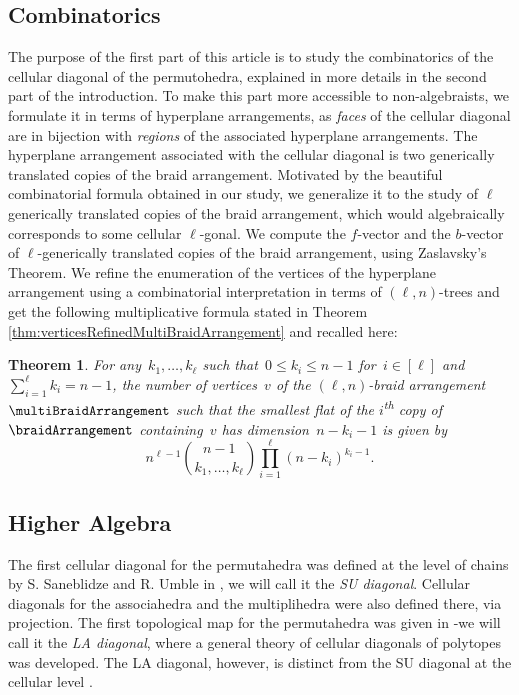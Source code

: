 \documentclass{amsart}
\newtheorem*{theorem*}{Theorem}
\theoremstyle{definition}
\newcommand{\ordinal}{\textsuperscript{th}} %
\begin{document}
\subsection*{Combinatorics}

The purpose of the first part of this article is to study the combinatorics of the cellular diagonal of the permutohedra, explained in more details in the second part of the introduction.
 To make this part more accessible to non-algebraists, we formulate it in terms of hyperplane arrangements, as \emph{faces} of the cellular diagonal are in bijection with \emph{regions} of the associated hyperplane arrangements. 
 The hyperplane arrangement associated with  the cellular diagonal is two generically translated copies of the braid arrangement. 
 Motivated by the beautiful combinatorial formula obtained in our study, we generalize it to the study of $\ell$ generically translated copies of the braid arrangement, which would algebraically corresponds to some cellular $\ell$-gonal.
  We compute the $f$-vector and the $b$-vector of $\ell$-generically translated copies of the braid arrangement, using Zaslavsky's Theorem. 
  We refine the enumeration of the vertices of the hyperplane arrangement using a combinatorial interpretation in terms of $(\ell, n)$-trees and get the following multiplicative formula stated in Theorem \ref{thm:verticesRefinedMultiBraidArrangement} and recalled here:
\begin{theorem*}
For any~$k_1, \dots, k_\ell$ such that~$0 \le k_i \le n-1$ for~$i \in [\ell]$ and~${\sum_{i=1}^\ell k_i = n-1}$, the number of vertices~$v$ of the $(\ell,n)$-braid arrangement~$\multiBraidArrangement$ such that the smallest flat of the $i$\ordinal{} copy of~$\braidArrangement$ containing~$v$ has dimension~$n-k_i-1$ is given by
\[
n^{\ell-1} \binom{n-1}{k_1, \dots, k_\ell} \prod_{i=1}^\ell (n-k_i)^{k_i-1}.
\]
\end{theorem*}


\subsection*{Higher Algebra}

The first cellular diagonal for the permutahedra was defined at the level of chains by S. Saneblidze and R. Umble in \cite{SaneblidzeUmble04}, we will call it the \emph{SU diagonal}. 
Cellular diagonals for the associahedra and the multiplihedra were also defined there, via projection. 
The first topological map for the permutahedra was given in \cite{LA21} -we will call it the \emph{LA diagonal}, where a general theory of cellular diagonals of polytopes was developed. 
The LA diagonal, however, is distinct from the SU diagonal at the cellular level \cite[Remark 3.19]{LA21}. 
\end{document}
